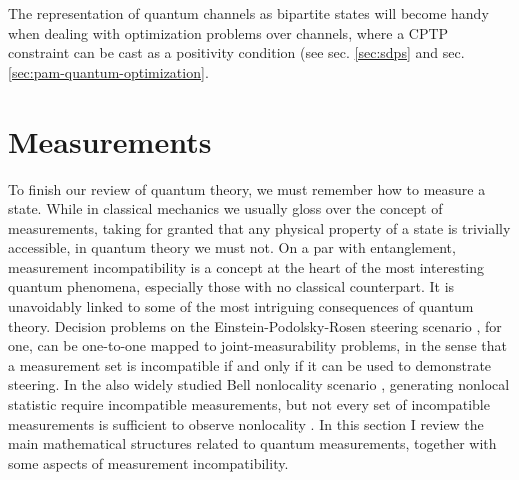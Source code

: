 		The representation of quantum channels as bipartite states will become handy when dealing with optimization problems over channels, where a CPTP constraint can be cast as a positivity condition (see sec. \ref{sec:sdps} and sec. \ref{sec:pam-quantum-optimization}.
		

	\section{Measurements}
	
		To finish our review of quantum theory, we must remember how to measure a state. While in classical mechanics we usually gloss over the concept of measurements, taking for granted that any physical property of a state is trivially accessible, in quantum theory we must not. On a par with entanglement, measurement incompatibility is a concept at the heart of the most interesting quantum phenomena, especially those with no classical counterpart. It is unavoidably linked to some of the most intriguing consequences of quantum theory. Decision problems on the Einstein-Podolsky-Rosen steering scenario \cite{uola_2020_steering,cavalcanti_2016_steering}, for one, can be one-to-one mapped to joint-measurability problems, in the sense that a measurement set is incompatible if and only if it can be used to demonstrate steering. In the also widely studied Bell nonlocality scenario \cite{brunner_2014_nonlocality}, generating nonlocal statistic require incompatible measurements, but not every set of incompatible measurements is sufficient to observe nonlocality \cite{quintino_2016_incompatibilitybell,quintino_2018_incompatibilitybellgeneral,bene_2018_incompatibilitybell}. In this section I review the main mathematical structures related to quantum measurements, together with some aspects of measurement incompatibility.
	
